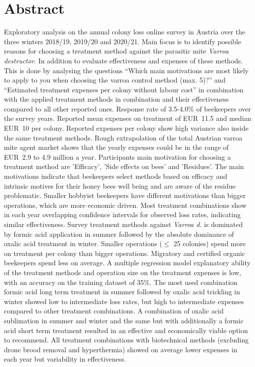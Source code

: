 \chapter*{Abstract}
\label{sec:abstract}
\vspace*{-10mm}

Exploratory analysis on the annual colony loss online survey in Austria over the three winters 2018/19, 2019/20 and 2020/21. Main focus is to identify possible reasons for choosing a treatment method against the parasitic mite \textit{Varroa destructor}. In addition to evaluate effectiveness and expenses of these methods. This is done by analysing the questions \enquote{Which main motivations are most likely to apply to you when choosing the varroa control method (max. 5)?} and \enquote{Estimated treatment expenses per colony without labour cost} in combination with the applied treatment methods in combination and their effectiveness compared to all other reported ones. Response rate of 3.5-4.0\% of beekeepers over the survey years. Reported mean expenses on treatment of EUR~11.5 and median EUR~10 per colony. Reported expenses per colony show high variance also inside the same treatment methods. Rough extrapolation of the total Austrian varroa mite agent market shows that the yearly expenses could be in the range of EUR~2.9 to 4.9 million a year. Participants main motivation for choosing a treatment method are 'Efficacy', 'Side effects on bees' and 'Residues'. The main motivations indicate that beekeepers select methods based on efficacy and intrinsic motives for their honey bees well being and are aware of the residue problematic. Smaller hobbyist beekeepers have different motivations than bigger operations, which are more economic driven. Most treatment combinations show in each year overlapping confidence intervals for observed loss rates, indicating similar effectiveness. Survey treatment methods against \textit{Varroa d.} is dominated by formic acid application in summer followed by the absolute dominance of oxalic acid treatment in winter. Smaller operations ($\leq$ 25 colonies) spend more on treatment per colony than bigger operations. Migratory and certified organic beekeepers spend less on average. A multiple regression model explanatory ability of the treatment methods and operation size on the treatment expenses is low, with an accuracy on the training dataset of 35\%. The most used combination formic acid long term treatment in summer followed by oxalic acid trickling in winter showed low to intermediate loss rates, but high to intermediate expenses compared to other treatment combinations. A combination of oxalic acid sublimation in summer and winter and the same but with additionally a formic acid short term treatment resulted in an effective and economically viable option to recommend. All treatment combinations with biotechnical methods (excluding drone brood removal and hyperthermia) showed on average lower expenses in each year but variability in effectiveness.
